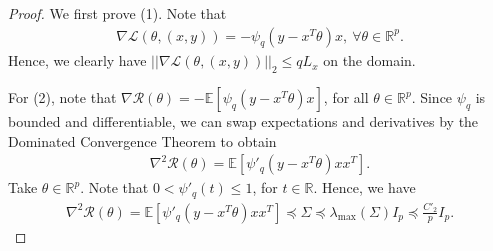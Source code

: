 \documentclass[10pt,a4paper]{amsart}
\newcommand{\indep}{\rotatebox[origin=c]{90}{$\models$}}
\begin{document}
\begin{proof}
We first prove (1).
Note that
\begin{align*}
\nabla \mathcal{L}(\theta, (x, y)) = -\psi_q(y - x^T\theta)x, \ \forall \theta \in \mathbb{R}^p. 
\end{align*}
Hence, we clearly have $||\nabla \mathcal{L}(\theta, (x, y))||_2 \leq q L_x$ on the domain.

For (2), note that $\nabla\mathcal{R}(\theta) = -\mathbb{E}[\psi_q(y - x^T\theta)x]$, for all $\theta \in \mathbb{R}^p$. Since $\psi_q$ is bounded and differentiable, we can swap expectations and derivatives by the Dominated Convergence Theorem to obtain 
\begin{align*}
\nabla^2\mathcal{R}(\theta) = \mathbb{E}[\psi'_q(y - x^T\theta)xx^T].
\end{align*}
Take $\theta \in \mathbb{R}^p$. Note that $0 < \psi'_q(t) \leq 1$, for $t \in \mathbb{R}$. Hence, we have
\begin{align*}
\nabla^2\mathcal{R}(\theta) = \mathbb{E}[\psi'_q(y - x^T\theta)xx^T] \preceq \Sigma \preceq \lambda_{\max}(\Sigma)I_p \preceq \frac{C'_2}{p}I_p.
\end{align*}


\end{proof}
\end{document}
